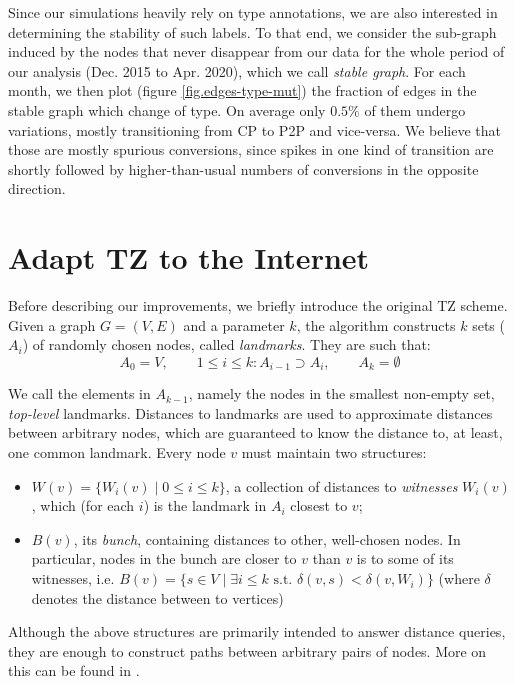 \documentclass[a4paper,11pt,oneside]{report}
\begin{document}
\bigskip
Since our simulations heavily rely on type annotations, we are also interested in determining the stability of such labels. To that end, we consider the sub-graph induced by the nodes that never disappear from our data for the whole period of our analysis (Dec. 2015 to Apr. 2020), which we call \emph{stable graph}. For each month, we then plot (figure \ref{fig.edges-type-mut}) the fraction of edges in the stable graph which change of type. On average only $0.5\%$ of them undergo variations, mostly transitioning from CP to P2P and vice-versa. We believe that those are mostly spurious conversions, since spikes in one kind of transition are shortly followed by higher-than-usual numbers of conversions in the opposite direction.

\chapter{Adapt TZ to the Internet}
\label{chap.adapt-tz-internet}

Before describing our improvements, we briefly introduce the original TZ scheme. Given a graph $G=(V, E)$ and a parameter $k$, the algorithm constructs $k$ sets ($A_i$) of randomly chosen nodes, called \emph{landmarks}. They are such that:
\[
A_0 = V, \qquad 1 \leq i \leq k: A_{i-1} \supset A_i, \qquad A_k = \emptyset
\]

We call the elements in $A_{k-1}$, namely the nodes in the smallest non-empty set, \emph{top-level} landmarks.
Distances to landmarks are used to approximate distances between arbitrary nodes, which are guaranteed to know the distance to, at least, one common landmark. Every node $v$ must maintain two structures:
\begin{itemize}
\item $W(v) = \{W_i(v) \;|\; 0 \leq i \leq k \}$, a collection of distances to \emph{witnesses} $W_i(v)$, which (for each $i$) is the landmark in $A_i$ closest to $v$;
\item $B(v)$, its \emph{bunch}, containing distances to other, well-chosen nodes. In particular, nodes in the bunch are closer to $v$ than $v$ is to some of its witnesses, i.e. $B(v) = \{s \in V \;\vert\; \exists i \leq k \text{ s.t. } \delta(v, s) < \delta(v, W_i)\}$ (where $\delta$ denotes the distance between to vertices)
\end{itemize}

Although the above structures are primarily intended to answer distance queries, they are enough to construct paths between arbitrary pairs of nodes. More on this can be found in \cite{thorupApproximateDistanceOracles2005}.
\end{document}
